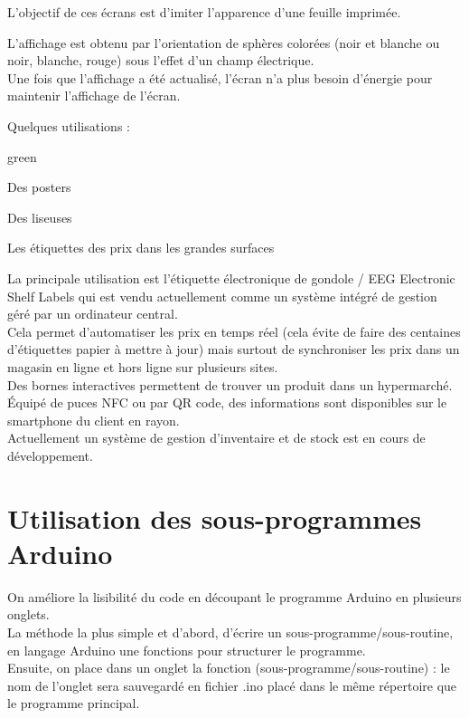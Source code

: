 L'objectif de ces écrans est d'imiter l'apparence d'une feuille imprimée.\\



L'affichage est obtenu par l'orientation de sphères colorées (noir et blanche ou noir, blanche, rouge) sous l'effet d'un champ électrique.\\ 
Une fois que l'affichage a été actualisé, l'écran n'a plus besoin d'énergie pour maintenir l'affichage de l'écran.



Quelques utilisations : \\
\begin{items}{green}{\Bullet}
    \item Des posters
    \item Des liseuses
    \item Les étiquettes des prix dans les grandes surfaces
\end{items}


La principale utilisation est l'étiquette électronique de gondole / EEG Electronic Shelf Labels 
qui est vendu actuellement comme un système intégré de gestion géré par un ordinateur central.\\
Cela permet d'automatiser les prix en temps réel (cela évite de faire des centaines d'étiquettes 
papier à mettre à jour) mais surtout de synchroniser les prix dans un magasin en ligne et 
hors ligne sur plusieurs sites.\\ 
Des bornes interactives permettent de trouver un produit dans un hypermarché.\\
Équipé de puces NFC ou par QR code, des informations sont disponibles sur le smartphone du client 
en rayon.\\
Actuellement un système de gestion d'inventaire et de stock est en cours de développement.


\chapter{Utilisation des sous-programmes Arduino}

On améliore la lisibilité du code en découpant le programme Arduino en plusieurs onglets. \\
La méthode la plus simple et d'abord, d'écrire un sous-programme/sous-routine, en langage 
Arduino une fonctions pour structurer le programme.\\ 
Ensuite, on place dans un onglet la fonction (sous-programme/sous-routine) : le nom de 
l'onglet sera sauvegardé en fichier .ino placé dans le même répertoire que le programme principal.\\

